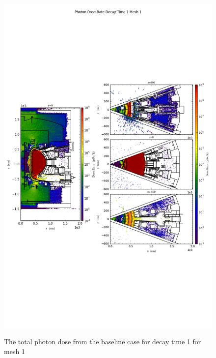 \begin{figure}[ht!]
\centering
\includegraphics[trim={0cm 9cm 0cm 10cm},clip,scale=0.75]{../plots/final_model_nob4c/Photon_Dose_Rate_Decay_Time_1_Mesh_1.png}
\label{fig:photons_dc1_no4bc_m1_flux}
\caption{The total photon dose from the baseline case for decay time 1 for mesh 1}
\end{figure}
